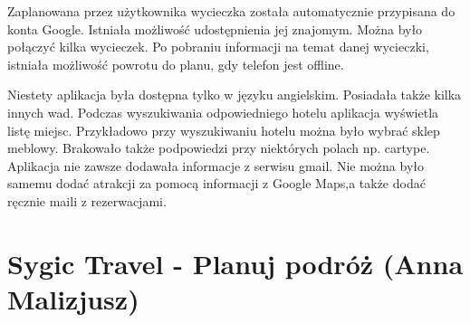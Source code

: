 \documentclass[10pt,twoside,a4paper]{report}
\begin{document}
\par Zaplanowana przez użytkownika wycieczka została automatycznie przypisana do konta Google. Istniała możliwość udostępnienia jej znajomym. Można było połączyć kilka wycieczek. Po pobraniu informacji na temat danej wycieczki, istniała możliwość powrotu do planu, gdy telefon jest offline.
\par Niestety aplikacja była dostępna tylko w języku angielskim. Posiadała także kilka innych wad. Podczas wyszukiwania odpowiedniego hotelu aplikacja wyświetla listę miejsc. Przykładowo przy wyszukiwaniu hotelu można było wybrać sklep meblowy. Brakowało także podpowiedzi przy niektórych polach np. cartype. Aplikacja nie zawsze dodawała informacje z serwisu gmail. Nie można było samemu dodać atrakcji za pomocą informacji z Google Maps,a także dodać ręcznie maili z rezerwacjami.

\section{Sygic Travel - Planuj podróż (Anna Malizjusz)}
\end{document}
